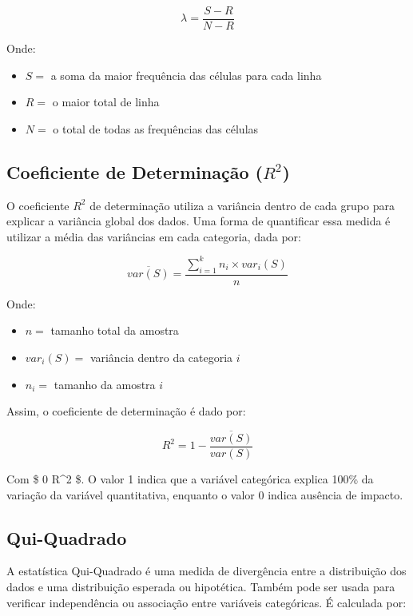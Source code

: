\documentclass[
]{estat/estat}
\providecommand{\tightlist}{%
  \setlength{\itemsep}{0pt}\setlength{\parskip}{0pt}}\usepackage{longtable,booktabs,array}
\begin{document}
\[
\lambda = \frac{S-R}{N-R}
\]

Onde:

\begin{itemize}
\tightlist
\item
  \(S =\) a soma da maior frequência das células para cada linha
\item
  \(R =\) o maior total de linha
\item
  \(N =\) o total de todas as frequências das células
\end{itemize}

\subsection{\texorpdfstring{Coeficiente de Determinação
(\(R^2\))}{Coeficiente de Determinação (R\^{}2)}}\label{coeficiente-de-determinauxe7uxe3o-r2}

O coeficiente \(R^2\) de determinação utiliza a variância dentro de cada
grupo para explicar a variância global dos dados. Uma forma de
quantificar essa medida é utilizar a média das variâncias em cada
categoria, dada por:

\[
\overline{var(S)} = \frac{\displaystyle \sum_{i=1}^{k}n_i \times var_i(S)}{n}
\]

Onde:

\begin{itemize}
\tightlist
\item
  \(n =\) tamanho total da amostra
\item
  \(var_i(S) =\) variância dentro da categoria \(i\)
\item
  \(n_i =\) tamanho da amostra \(i\)
\end{itemize}

Assim, o coeficiente de determinação é dado por:

\[
R^2 = 1 - \frac{\overline{var(S)}}{var(S)}
\]

Com \$ 0 \leq R\^{}2 \$. O valor 1 indica que a variável
categórica explica 100\% da variação da variável quantitativa, enquanto
o valor 0 indica ausência de impacto.

\subsection{Qui-Quadrado}\label{qui-quadrado}

A estatística Qui-Quadrado é uma medida de divergência entre a
distribuição dos dados e uma distribuição esperada ou hipotética. Também
pode ser usada para verificar independência ou associação entre
variáveis categóricas. É calculada por:
\end{document}
